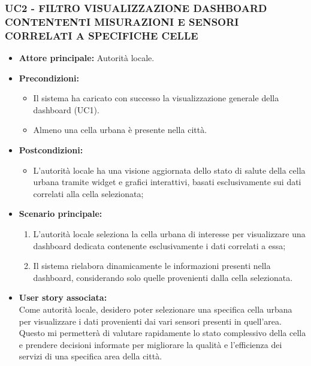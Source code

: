 \subsubsection{UC2 - FILTRO VISUALIZZAZIONE DASHBOARD CONTENTENTI MISURAZIONI E SENSORI CORRELATI A SPECIFICHE CELLE}
\begin{itemize}
    \item \textbf{Attore principale:} Autorità locale.
    \item \textbf{Precondizioni:}
        \begin{itemize}
            \item Il sistema ha caricato con successo la visualizzazione generale della dashboard (UC1). 
            \item Almeno una cella urbana è presente nella città. 
        \end{itemize}
    \item \textbf{Postcondizioni:}
        \begin{itemize}
            \item L’autorità locale ha una visione aggiornata dello stato di salute della cella urbana tramite widget e grafici interattivi, basati esclusivamente sui dati correlati alla cella selezionata; 
        \end{itemize}
    \item \textbf{Scenario principale:}
        \begin{enumerate}
            \item L’autorità locale seleziona la cella urbana di interesse per visualizzare una dashboard dedicata contenente esclusivamente i dati correlati a essa;
            \item Il sistema rielabora dinamicamente le informazioni presenti nella dashboard, considerando solo quelle provenienti dalla cella selezionata.
        \end{enumerate}
    \item \textbf{User story associata:} \\ 
        Come autorità locale, desidero poter selezionare una specifica cella urbana per visualizzare i dati provenienti dai vari sensori presenti in quell’area. Questo mi permetterà di valutare rapidamente lo stato complessivo della cella e prendere decisioni informate per migliorare la qualità e l'efficienza dei servizi di una specifica area della città.
\end{itemize}

